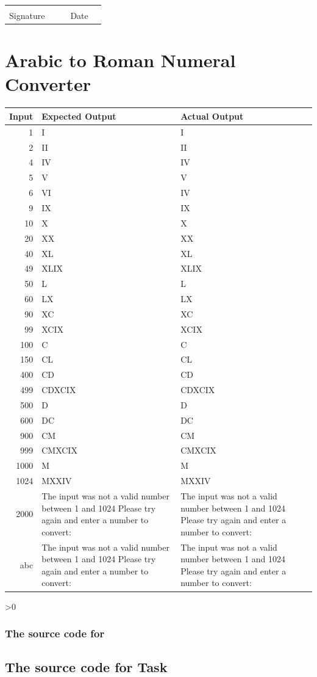 \documentclass[12pt,a4paper,onesided]{report}
\newcommand{\source}{\pagebreak
	\ifnum\value{section}>0
		\subsection{The source code for \thesection}

	\else
		\section{The source code for Task \thechapter}

	\fi
	}
\begin{document}
\vspace{5em}
\begin{table}[h]
	\centering
\begin{tabular}{lp{20ex}p{20ex}lp{20ex}}
	 & & &  & \\\cline{1-2} \cline{4-5}
	 Signature & & & Date &\\
\end{tabular}
\end{table}
\chapter{Arabic to Roman Numeral Converter}
\vspace{-3em}
	\begin{tabular}{rp{36ex}p{36ex}}
		\toprule Input & Expected Output & Actual Output\\
		\midrule
		1 & I & I\\
		2 & II & II\\
		4 & IV & IV\\
		5 & V & V\\
		6 & VI & IV \\
		9 & IX & IX \\
		10 & X & X \\
		20 & XX & XX \\
		40 & XL & XL\\
		49 & XLIX & XLIX\\
		50 & L & L \\
		60 & LX & LX \\
		90 & XC & XC \\
		99 & XCIX & XCIX \\
		100 & C & C\\ 
		150 & CL & CL \\
		400 & CD & CD \\
		499 & CDXCIX & CDXCIX \\
		500 & D & D\\
		600 & DC & DC\\
		900 & CM & CM\\
		999 & CMXCIX & CMXCIX\\
		1000& M & M\\
		1024& MXXIV & MXXIV\\
		2000& The input was not a valid number between 1 and 1024 Please try again and enter a number to convert: &  The input was not a valid number between 1 and 1024 Please try again and enter a number to convert:\\
		abc& The input was not a valid number between 1 and 1024 Please try again and enter a number to convert: &  The input was not a valid number between 1 and 1024 Please try again and enter a number to convert:\\
				
		\bottomrule
				
	\end{tabular}
\source

\end{document}
